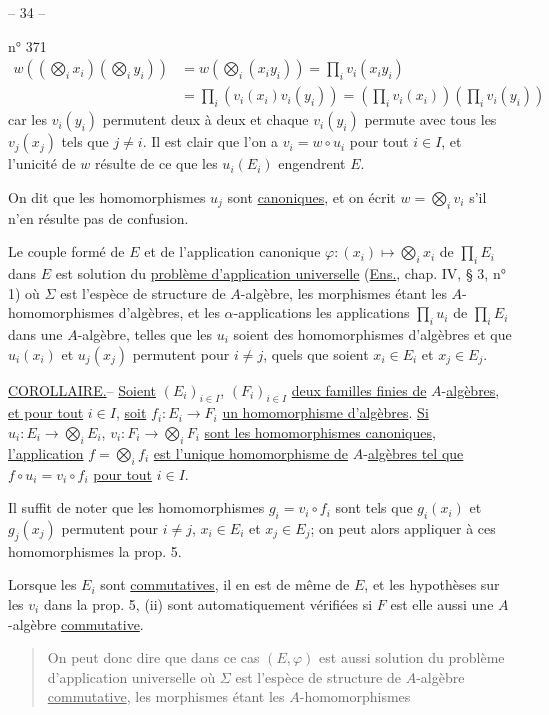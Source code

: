 \begin{center}-- 34 --\end{center}
\hfill n° 371
\[
\begin{aligned}
w((\bigotimes_i x_i)(\bigotimes_i y_i))&=w(\bigotimes_i(x_i y_i))=\prod_i v_i(x_i y_i)\\
&=\prod_i(v_i(x_i)v_i(y_i))=(\prod_i v_i(x_i))(\prod_i v_i(y_i))
\end{aligned}
\]
car les $v_i(y_i)$ permutent deux à deux et chaque $v_i(y_i)$ permute avec tous les $v_j(x_j)$ tels que $j\ne i$. Il est clair que l'on a $v_i=w\circ u_i$ pour tout $i\in I$, et l'unicité de $w$ résulte de ce que les $u_i(E_i)$ engendrent $E$.

On dit que les homomorphismes $u_j$ sont \uline{canoniques}, et on écrit $w=\bigotimes_i v_i$ s'il n'en résulte pas de confusion.

Le couple formé de $E$ et de l'application canonique $\varphi:(x_i)\mapsto\bigotimes_i x_i$ de $\prod_i E_i$ dans $E$ est solution du \uline{problème d'application universelle} (\uline{Ens.}, chap. IV, § 3, n° 1) où $\Sigma$ est l'espèce de structure de $A$-algèbre, les morphismes étant les $A$-homomorphismes d'algèbres, et les $\alpha$-applications les applications $\prod_i u_i$ de $\prod_i E_i$ dans une $A$-algèbre, telles que les $u_i$ soient des homomorphismes d'algèbres et que $u_i(x_i)$ et $u_j(x_j)$ permutent pour $i\ne j$, quels que soient $x_i\in E_i$ et $x_j\in E_j$.

\uline{COROLLAIRE.}-- \uline{Soient} $(E_i)_{i\in I}$, $(F_i)_{i\in I}$ \uline{deux familles finies de} $A$-\uline{algèbres}, \uline{et pour tout} $i\in I$, \uline{soit} $f_i:E_i\to F_i$ \uline{un homomorphisme d'algèbres}. \uline{Si} $u_i:E_i\to\bigotimes_i E_i$, $v_i:F_i\to\bigotimes_i F_i$ \uline{sont les homomorphismes canoniques}, \uline{l'application} $f=\bigotimes_i f_i$ \uline{est l'unique homomorphisme de} $A$-\uline{algèbres tel que} $f\circ u_i=v_i\circ f_i$ \uline{pour tout} $i\in I$.

Il suffit de noter que les homomorphismes $g_i=v_i\circ f_i$ sont tels que $g_i(x_i)$ et $g_j(x_j)$ permutent pour $i\ne j$, $x_i\in E_i$ et $x_j\in E_j$; on peut alors appliquer à ces homomorphismes la prop. 5.

Lorsque les $E_i$ sont \uline{commutatives}, il en est de même de $E$, et les hypothèses sur les $v_i$ dans la prop. 5, (ii) sont automatiquement vérifiées si $F$ est elle aussi une $A$-algèbre \uline{commutative}.

\begin{quote}
On peut donc dire que dans ce cas $(E,\varphi)$ est aussi solution du problème d'application universelle où $\Sigma$ est l'espèce de structure de $A$-algèbre \uline{commutative}, les morphismes étant les $A$-homomorphismes
\end{quote}
